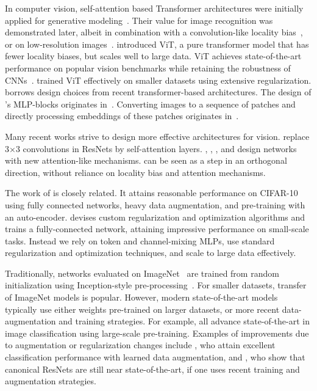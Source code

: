 In computer vision, self-attention based Transformer architectures were initially applied for generative modeling~\cite{child2019-sparsetransformers,parmar18-imagetransformer}.
Their value for image recognition was demonstrated later, albeit in combination with a convolution-like locality bias~\cite{ramachandran19-sasa}, or on 
low-resolution images~\cite{cordonnier2020-sacnn}.
\citet{Dosovitskiy2021} introduced ViT, a pure transformer model that has fewer locality biases, but scales well to large data. 
ViT achieves state-of-the-art performance on popular vision benchmarks while retaining the robustness 
of CNNs~\cite{bhojanapalli2021understanding}. 
\citet{deit} trained ViT effectively on smaller datasets using extensive regularization.
\name{} borrows design choices from recent transformer-based architectures.
The design of \name{}'s MLP-blocks originates in~\citet{vaswani2017}.
Converting images to a sequence of patches and directly processing embeddings of these patches originates in~\citet{Dosovitskiy2021}.

Many recent works strive to design more effective architectures for vision. 
\citet{srinivas2021bottleneck} replace 3$\times$3 convolutions in ResNets by self-attention layers.
\citet{ramachandran19-sasa}, \citet{tay20synthesizer}, \citet{li2021involution}, and \citet{bello2021lambdanetworks} design networks
with new attention-like mechanisms. 
\name{} can be seen as a step in an orthogonal direction, without reliance on locality bias and attention mechanisms.

The work of \citet{lin2016mlp} is closely related.
It attains reasonable performance on CIFAR-10 using fully connected networks, heavy data augmentation, and pre-training with an auto-encoder.
\citet{neyshabur2020towards} devises custom regularization and optimization algorithms and trains a fully-connected network, attaining impressive performance on small-scale
tasks.
Instead we rely on token and channel-mixing MLPs, use standard regularization and optimization techniques, and scale to large data effectively. 

Traditionally, networks evaluated on ImageNet~\citep{deng2009-imagenet} are trained from random initialization using Inception-style pre-processing~\citep{inception}.
For smaller datasets, transfer of ImageNet models is popular.
However, modern state-of-the-art models typically use either weights pre-trained on larger datasets, or more recent data-augmentation and training strategies.
For example, \citet{Dosovitskiy2021,kolesnikov2020-bit,mahajan2018,pham2020meta,xie2020-noisystudent} all advance state-of-the-art in image classification using large-scale pre-training.
Examples of improvements due to augmentation or regularization changes include \citet{autoaugment}, who attain excellent classification performance with learned data augmentation, and \citet{bello2021revisiting}, who show that canonical ResNets are still near state-of-the-art, if one uses recent training and augmentation strategies.

